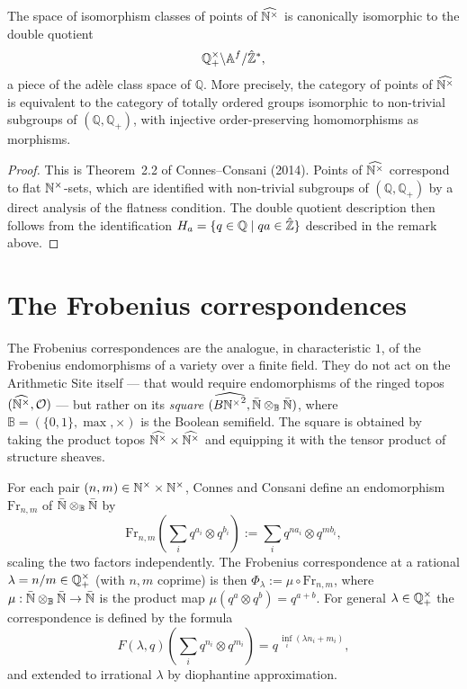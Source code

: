 \begin{theorem}[label=thm:points_are_adele_classes,
               uses=def:topos_point, def:arithmetic_site]
  \label{thm:points_are_adele_classes}
  The space of isomorphism classes of points of $\widehat{\mathbb{N}^{\times}}$ is
  canonically isomorphic to the double quotient
  \[
    \mathbb{Q}^{\times}_{+} \backslash \mathbb{A}^{f} / \hat{\mathbb{Z}}^*,
  \]
  a piece of the ad\`ele class space of $\mathbb{Q}$.  More precisely,
  the category of points of $\widehat{\mathbb{N}^{\times}}$ is equivalent to the category
  of totally ordered groups isomorphic to non-trivial subgroups of
  $(\mathbb{Q}, \mathbb{Q}_+)$, with injective order-preserving
  homomorphisms as morphisms.
\end{theorem}
\begin{proof}
  This is Theorem~2.2 of Connes--Consani (2014).  Points of
  $\widehat{\mathbb{N}^{\times}}$ correspond to flat $\mathbb{N}^{\times}$-sets, which are identified
  with non-trivial subgroups of $(\mathbb{Q}, \mathbb{Q}_+)$ by a direct
  analysis of the flatness condition.  The double quotient description
  then follows from the identification $H_a = \{ q \in \mathbb{Q} \mid
  qa \in \hat{\mathbb{Z}}\}$ described in the remark above. \sorry
\end{proof}

\chapter{The Frobenius correspondences}
\label{chap:frobenius_correspondences}

The Frobenius correspondences are the analogue, in characteristic $1$,
of the Frobenius endomorphisms of a variety over a finite field.  They
do not act on the Arithmetic Site itself --- that would require
endomorphisms of the ringed topos $(\widehat{\mathbb{N}^{\times}}, \mathcal{O})$ ---
but rather on its \emph{square} $(\widehat{B{\mathbb{N}^{\times}}^2},
\bar{\mathbb{N}} \otimes_{\mathbb{B}} \bar{\mathbb{N}})$, where $\mathbb{B} = (\{0,1\},
\max, \times)$ is the Boolean semifield.  The square is obtained by
taking the product topos $\widehat{\mathbb{N}^{\times}} \times \widehat{\mathbb{N}^{\times}}$ and
equipping it with the tensor product of structure sheaves.

For each pair $(n, m) \in \mathbb{N}^{\times} \times \mathbb{N}^{\times}$, Connes and Consani
define an endomorphism $\mathrm{Fr}_{n,m}$ of $\bar{\mathbb{N}} \otimes_{\mathbb{B}}
\bar{\mathbb{N}}$ by
\[
  \mathrm{Fr}_{n,m}\!\left(\sum_i q^{a_i} \otimes q^{b_i}\right)
  := \sum_i q^{na_i} \otimes q^{mb_i},
\]
scaling the two factors independently.  The Frobenius correspondence at
a rational $\lambda = n/m \in \mathbb{Q}^{\times}_{+}$ (with $n, m$ coprime) is then
$\Phi_\lambda := \mu \circ \mathrm{Fr}_{n,m}$, where $\mu : \bar{\mathbb{N}}
\otimes_{\mathbb{B}} \bar{\mathbb{N}} \to \bar{\mathbb{N}}$ is the product map
$\mu(q^a \otimes q^b) = q^{a+b}$.  For general $\lambda \in \mathbb{Q}^{\times}_{+}$
the correspondence is defined by the formula
\[
  F(\lambda, q)\!\left(\sum_i q^{n_i} \otimes q^{m_i}\right)
  = q^{\,\inf_i(\lambda n_i + m_i)},
\]
and extended to irrational $\lambda$ by diophantine approximation.

